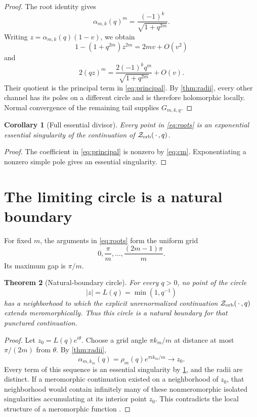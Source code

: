 \documentclass[11pt]{article}
\newtheorem{theorem}{Theorem}[section]
\newtheorem{corollary}[theorem]{Corollary}
\newcommand{\Zorb}{\mathcal Z_{\rm orb}}
\begin{document}
\begin{proof}
The root identity gives
\[
 \alpha_{m,k}(q)^m=
 \frac{(-1)^k}{\sqrt{1+q^{2m}}}.
\]
Writing $z=\alpha_{m,k}(q)(1-v)$, we obtain
\[
 1-(1+q^{2m})z^{2m}=2mv+O(v^2)
\]
and
\[
 2(qz)^m=
 \frac{2(-1)^kq^m}{\sqrt{1+q^{2m}}}+O(v).
\]
Their quotient is the principal term in \eqref{eq:principal}.  By
\cref{thm:radii}, every other channel has its poles on a different circle
and is therefore holomorphic locally.  Normal convergence of the remaining
tail supplies $G_{m,k,q}$.
\end{proof}

\begin{corollary}[Full essential divisor]\label{cor:essential}
Every point in \eqref{eq:roots} is an exponential essential singularity of
the continuation of \(\Zorb(\,\cdot\,,q)\).
\end{corollary}

\begin{proof}
The coefficient in \eqref{eq:principal} is nonzero by \eqref{eq:cm}.
Exponentiating a nonzero simple pole gives an essential singularity.
\end{proof}

\section{The limiting circle is a natural boundary}

For fixed $m$, the arguments in \eqref{eq:roots} form the uniform grid
\[
 0,\frac{\pi}{m},\ldots,\frac{(2m-1)\pi}{m}.
\]
Its maximum gap is $\pi/m$.

\begin{theorem}[Natural-boundary circle]\label{thm:natural}
For every $q>0$, no point of the circle
\[
 |z|=L(q)=\min(1,q^{-1})
\]
has a neighborhood to which the explicit unrenormalized continuation
\(\Zorb(\,\cdot\,,q)\) extends meromorphically.  Thus this circle is a
natural boundary for that punctured continuation.
\end{theorem}

\begin{proof}
Let \(z_0=L(q)e^{i\theta}\).  Choose a grid angle
\(\pi k_m/m\) at distance at most \(\pi/(2m)\) from $\theta$.  By
\cref{thm:radii},
\[
 \alpha_{m,k_m}(q)
 =\rho_m(q)e^{\pi i k_m/m}\longrightarrow z_0.
\]
Every term of this sequence is an essential singularity by
\cref{cor:essential}, and the radii are distinct.  If a meromorphic
continuation existed on a neighborhood of $z_0$, that neighborhood would
contain infinitely many of these nonmeromorphic isolated singularities
accumulating at its interior point $z_0$.  This contradicts the local
structure of a meromorphic function \cite{Conway1978}.
\end{proof}
\end{document}
